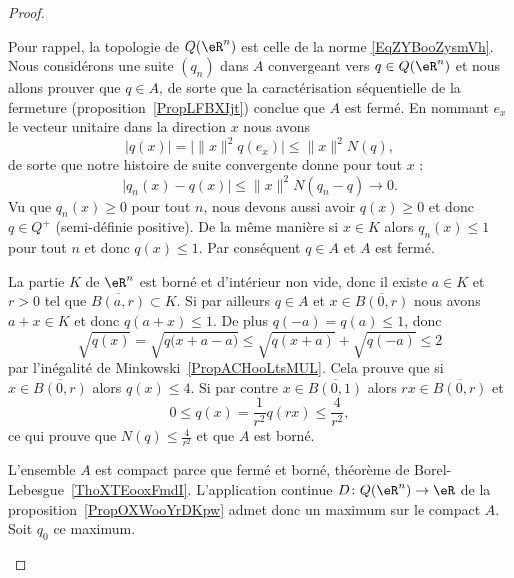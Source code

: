\begin{proof}
\begin{subproof}
\begin{subproof}
			\spitem[Fermé]

			Pour rappel, la topologie de \( Q(\eR^n)\) est celle de la norme \eqref{EqZYBooZysmVh}. Nous considérons une suite \( (q_n)\) dans \( A\) convergeant vers \( q\in Q(\eR^n)\) et nous allons prouver que \( q\in A\), de sorte que la caractérisation séquentielle de la fermeture (proposition~\ref{PropLFBXIjt}) conclue que \( A\) est fermé. En nommant \( e_x\) le vecteur unitaire dans la direction \( x\) nous avons
			\begin{equation}
				\big| q(x) \big|=\big| \| x \|^2q(e_x) \big|\leq \| x \|^2N(q),
			\end{equation}
			de sorte que notre histoire de suite convergente  donne pour tout \( x\) :
			\begin{equation}
				\big| q_n(x)-q(x) \big|\leq \| x \|^2N(q_n-q)\to 0.
			\end{equation}
			Vu que \( q_n(x)\geq 0\) pour tout \( n\), nous devons aussi avoir \( q(x)\geq 0\) et donc \( q\in Q^+\) (semi-définie positive). De la même manière si \( x\in K\) alors \( q_n(x)\leq 1\) pour tout \( n\) et donc \( q(x)\leq 1\). Par conséquent \( q\in A\) et \( A\) est fermé.

			\spitem[Borné]

			La partie \( K\) de \( \eR^n\) est borné et d'intérieur non vide, donc il existe \( a\in K\) et \( r>0\) tel que \( \overline{ B(a,r) }\subset K\). Si par ailleurs \( q\in A\) et \( x\in\overline{ B(0,r) }\) nous avons \( a+x\in K\) et donc \( q(a+x)\leq 1\). De plus \( q(-a)=q(a)\leq 1\), donc
			\begin{equation}
				\sqrt{q(x)}=\sqrt{q\big( x+a-a \big)}\leq \sqrt{q(x+a)}+\sqrt{q(-a)}\leq 2
			\end{equation}
			par l'inégalité de Minkowski~\ref{PropACHooLtsMUL}. Cela prouve que si \( x\in\overline{ B(0,r) }\) alors \( q(x)\leq 4\). Si par contre \( x\in\overline{ B(0,1) }\) alors \( rx\in\overline{ B(0,r) } \) et
			\begin{equation}
				0\leq q(x)=\frac{1}{ r^2 }q(rx)\leq \frac{ 4 }{ r^2 },
			\end{equation}
			ce qui prouve que \( N(q)\leq \frac{ 4 }{ r^2 }\) et que \( A\) est borné.


		\end{subproof}

		L'ensemble \( A\) est compact parce que fermé et borné, théorème de Borel-Lebesgue~\ref{ThoXTEooxFmdI}. L'application continue \( D\colon Q(\eR^n)\to \eR\) de la proposition~\ref{PropOXWooYrDKpw} admet donc un maximum sur le compact \( A\). Soit \( q_0\) ce maximum.


\end{subproof}
\end{proof}
